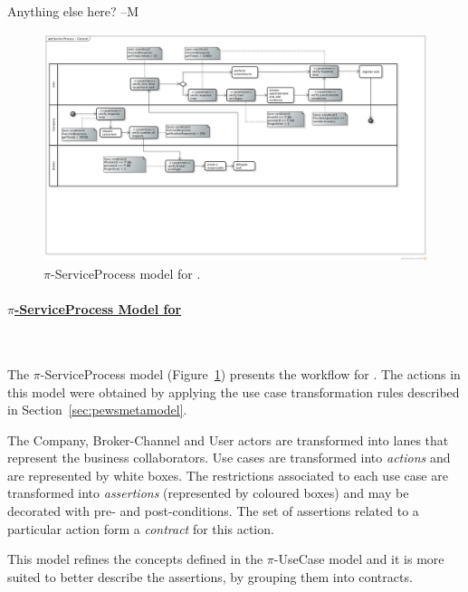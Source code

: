 {\color{red} Anything else here? --M}

\begin{figure}
\centering
\includegraphics[width=1.0\textwidth]{figs/ServiceProcessGeneral.png}
\caption{$\pi$-ServiceProcess model for \FlyingPig.\label{fig:PiServiceProcessModel}}
\end{figure}

\paragraph{\underline{$\pi$-ServiceProcess Model for \FlyingPig}}~

The $\pi$-ServiceProcess model (Figure~\ref{fig:PiServiceProcessModel}) presents the workflow for \FlyingPig.
The actions in this model were obtained by applying the use case transformation rules described in Section~\ref{sec:pewsmetamodel}.

The Company, Broker-Channel and User actors are transformed into lanes that represent the business collaborators.
Use cases are transformed into \textit{actions} and are represented by white boxes.
The restrictions associated to each use case are transformed into \textit{assertions} (represented by coloured boxes) and may be decorated with pre- and post-conditions. 
The set of assertions related to a particular action form a \textit{contract} for this action. 

This model refines the concepts defined in the $\pi$-UseCase model and it is more suited to better describe the assertions, by grouping them into contracts.

